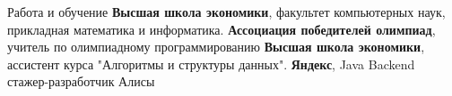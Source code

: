 \begin{rubric}{Работа и обучение}
\entry*[2019 -- 2023]
	\textbf{Высшая школа экономики}, факультет компьютерных наук, прикладная математика и информатика.
\entry*[2019 -- 2020]
	\textbf{Ассоциация победителей олимпиад}, учитель по олимпиадному программированию
\entry*[2020 -- 2021]
    \textbf{Высшая школа экономики}, ассистент курса "Алгоритмы и структуры данных".
\entry*[2020 -- н.в.]
	\textbf{Яндекс}, Java Backend стажер-разработчик Алисы
\end{rubric}